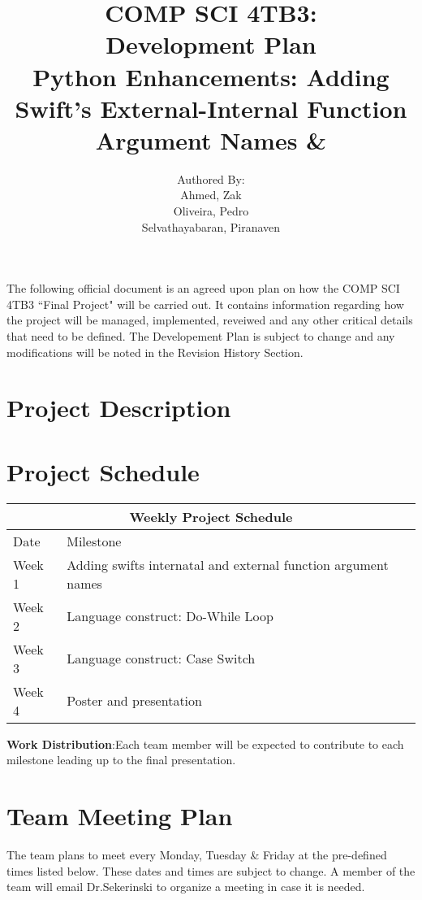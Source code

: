 \documentclass{article}
\title{COMP SCI 4TB3:\\ Development Plan\\ Python Enhancements:  Adding Swift's External-Internal Function Argument Names \& }
\author{ Authored By:
		\\ Ahmed, Zak
		\\ Oliveira, Pedro
		\\ Selvathayabaran, Piranaven
}
\date{}
\begin{document}
\newpage

\maketitle

The following official document is an agreed upon plan on how the COMP SCI 4TB3 ``Final Project" will be carried out. It contains information regarding how the project will be managed, implemented, reveiwed and any other critical details that need to be defined. The Developement Plan is subject to change and any modifications will be noted in the Revision History Section. 

\tableofcontents 

\newpage 

\section {Project Description}

 
 \section{Project Schedule}

\begin{tabular}{ |p{3cm}|p{10cm}| }
 \hline
 \multicolumn{2}{|c|}{Weekly Project Schedule} \\
 \hline
 Date & Milestone \\
  \hline
 Week 1 & Adding swifts internatal and external function argument names\\
 Week 2 & Language construct: Do-While Loop \\
 Week 3 & Language construct: Case Switch \\
  Week 4 & Poster and presentation \\
  
 \hline
\end{tabular}

\par{\textbf{Work Distribution}:Each team member will be expected to contribute to each milestone leading up to the final presentation.}
 
\section{Team Meeting Plan}
The team plans to meet every Monday, Tuesday \& Friday at the pre-defined times listed below. These dates and times are subject to change. A member of the team will email Dr.Sekerinski to organize a meeting in case it is needed.\newline 
\end{document}
